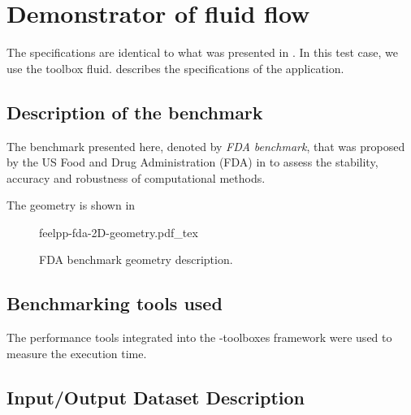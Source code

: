 
\section{Demonstrator of fluid flow}


The specifications are identical to what was presented in .
In this test case, we use the \Feelpp toolbox fluid.
 describes the specifications of the application.


\subsection{Description of the benchmark}

The benchmark presented here, denoted by \emph{FDA benchmark}, that was proposed by the US Food and Drug Administration (FDA) in \cite{hariharan_multilaboratory_2011} to assess the stability, accuracy and robustness of computational methods.

The geometry is shown in 

\begin{figure}[!ht]
  \centering
  \def\svgwidth{\textwidth}
  {feelpp-fda-2D-geometry.pdf_tex}
  \caption{FDA benchmark geometry description.}
  \label{fig:spec:app-feelpp-discr-2:fda:geometry}
\end{figure}



\subsection{Benchmarking tools used}


The performance tools integrated into the \Feelpp-toolboxes framework were used to measure the execution time.






\subsection{Input/Output Dataset Description}


